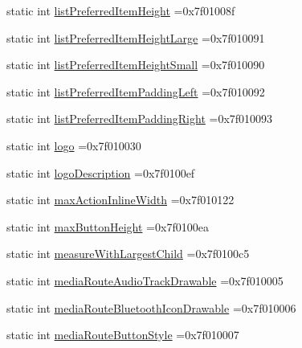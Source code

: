 \begin{DoxyCompactItemize}
static int \hyperlink{classandroid_1_1support_1_1v7_1_1cardview_1_1R_1_1attr_a676d09478b28e34ac27954c7b6164b44}{list\+Preferred\+Item\+Height} =0x7f01008f
\item 
static int \hyperlink{classandroid_1_1support_1_1v7_1_1cardview_1_1R_1_1attr_a8fc05e30e3bec2d22a56a586b5306a3b}{list\+Preferred\+Item\+Height\+Large} =0x7f010091
\item 
static int \hyperlink{classandroid_1_1support_1_1v7_1_1cardview_1_1R_1_1attr_aa08a6c18bbbeafe82c27115aad7a9682}{list\+Preferred\+Item\+Height\+Small} =0x7f010090
\item 
static int \hyperlink{classandroid_1_1support_1_1v7_1_1cardview_1_1R_1_1attr_a7bc3c12c42966b895676e5dae546ee29}{list\+Preferred\+Item\+Padding\+Left} =0x7f010092
\item 
static int \hyperlink{classandroid_1_1support_1_1v7_1_1cardview_1_1R_1_1attr_ad167e5c7c6361cf67c9055d74ade04c3}{list\+Preferred\+Item\+Padding\+Right} =0x7f010093
\item 
static int \hyperlink{classandroid_1_1support_1_1v7_1_1cardview_1_1R_1_1attr_ad7f81cd76bf157d46c8917cf4d3d886c}{logo} =0x7f010030
\item 
static int \hyperlink{classandroid_1_1support_1_1v7_1_1cardview_1_1R_1_1attr_ad3e2f083139412eba5cf3a9f92922ef3}{logo\+Description} =0x7f0100ef
\item 
static int \hyperlink{classandroid_1_1support_1_1v7_1_1cardview_1_1R_1_1attr_a23452c6aa2d34fcffde5be3a48f5723e}{max\+Action\+Inline\+Width} =0x7f010122
\item 
static int \hyperlink{classandroid_1_1support_1_1v7_1_1cardview_1_1R_1_1attr_ac1e386294c7f266fd78e00b818be9a3d}{max\+Button\+Height} =0x7f0100ea
\item 
static int \hyperlink{classandroid_1_1support_1_1v7_1_1cardview_1_1R_1_1attr_a310436bd0218ec6341dca4db85bbf509}{measure\+With\+Largest\+Child} =0x7f0100c5
\item 
static int \hyperlink{classandroid_1_1support_1_1v7_1_1cardview_1_1R_1_1attr_a6dc9dcb137551ffff0f4154a3d9c4a0e}{media\+Route\+Audio\+Track\+Drawable} =0x7f010005
\item 
static int \hyperlink{classandroid_1_1support_1_1v7_1_1cardview_1_1R_1_1attr_a4b01c22c10b3cdef8dc8bb4653115f7c}{media\+Route\+Bluetooth\+Icon\+Drawable} =0x7f010006
\item 
static int \hyperlink{classandroid_1_1support_1_1v7_1_1cardview_1_1R_1_1attr_a21413797e96a031cac7e0b62ec9fbcd7}{media\+Route\+Button\+Style} =0x7f010007
\item 

\end{DoxyCompactItemize}
